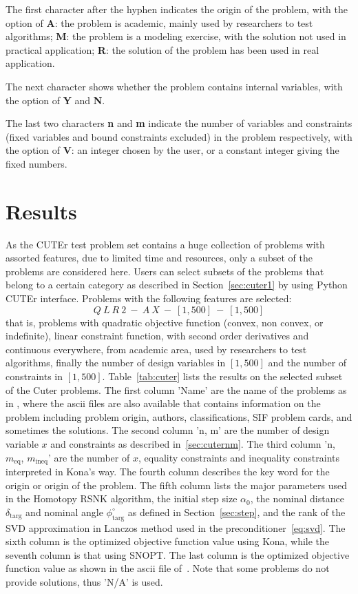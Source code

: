 The first character after the hyphen indicates the origin of the problem, with the option of \textbf{A}: the problem is academic, mainly used by researchers to test algorithms; \textbf{M}: the problem is a modeling exercise, with the solution not used in practical application; \textbf{R}: the solution of the problem has been used in real application.  

The next character shows whether the problem contains internal variables, with the option of \textbf{Y} and \textbf{N}. 

The last two characters \textbf{n} and \textbf{m} indicate the number of variables and constraints (fixed variables and bound constraints excluded) in the problem respectively, with the option of \textbf{V}: an integer chosen by the user, or a constant integer giving the fixed numbers. 

\section{Results}
As the CUTEr test problem set contains a huge collection of problems with assorted features, due to limited time and resources, only a subset of the problems are considered here. Users can select subsets of the problems that belong to a certain category as described in Section~\ref{sec:cuter1} by using Python CUTEr interface. Problems with the following features are selected:
\begin{equation*}
Q \ L \ R \ 2 \ - \ A \ X \ - \ [1,500] \ - \ [1,500]
\end{equation*}
that is, problems with quadratic objective function (convex, non convex, or indefinite), linear constraint function, with second order derivatives and continuous everywhere, from academic area, used by researchers to test algorithms, finally the number of design variables in $[1,500]$ and the number of constraints in $[1,500]$.  Table~\ref{tab:cuter} lists the results on the selected subset of the Cuter problems. The first column 'Name'  are the name of the problems as in \cite{cuter_probs}, where the ascii files are also available that contains information on the problem including problem origin, authors, classifications, SIF problem cards, and sometimes the solutions. The second column 'n, m' are the number of design variable $x$ and constraints as described in~\ref{sec:cuternm}. The third column 'n,  $m_{\text{eq}}$,  $m_{\text{ineq}}$' are the number of $x$, equality constraints and inequality constraints interpreted in Kona's way. The fourth column describes the key word for the origin or origin of the problem. The fifth column lists the major parameters used in the Homotopy RSNK algorithm, the initial step size $\textbf{$\alpha_0$}$, the nominal distance  $\delta_{\text{targ}}$  and nominal angle $\phi^{\circ}_{\text{targ}}$ as defined in Section~\ref{sec:step}, and the rank of the SVD approximation in Lanczos method used in the preconditioner~\ref{eq:svd}. The sixth column is the optimized objective function value using Kona, while the seventh column is that using SNOPT. The last column is the optimized objective function value as shown in the ascii file of~\cite{cuter_probs}. Note that some problems do not provide solutions, thus 'N/A' is used. 

